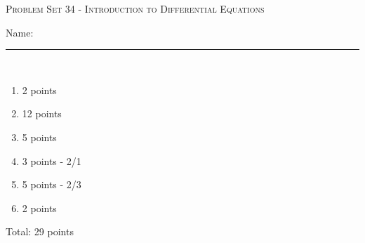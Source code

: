 \documentclass{article}
\begin{document}
\begin{center}
  \large\textsc{Problem Set 34 - Introduction to Differential Equations}
  
      \pspace{12pt}
  \begin{problemonly}\large Name: \rule{5cm}{0.15mm}\\ \end{problemonly}
\end{center}

\begin{grading}
  
    \begin{enumerate}
    \item 2 points
    \item 12 points 
    \item 5 points
    \item 3 points - 2/1
    \item 5 points - 2/3
    \item 2 points 
    \end{enumerate}
  Total: 29 points
\end{grading}
\end{document}
